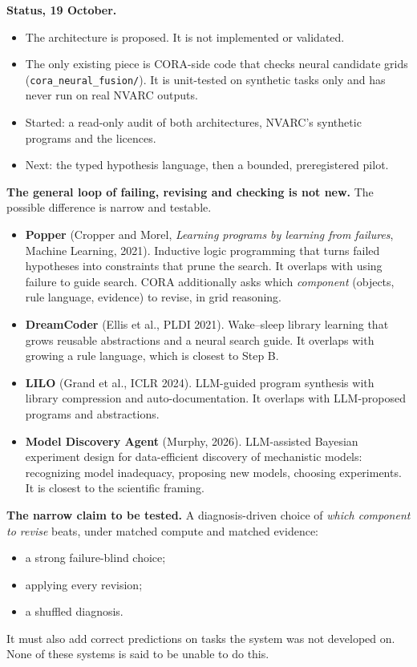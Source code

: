 \documentclass[11pt]{article}
\newcommand{\page}[1]{\clearpage{\Large\bfseries #1}\par\vspace{0.2em}}
\begin{document}
\textbf{Status, 19 October.}
\begin{itemize}
  \item The architecture is proposed. It is not implemented or validated.
  \item The only existing piece is CORA-side code that checks neural candidate grids (\texttt{cora\_neural\_fusion/}).
        It is unit-tested on synthetic tasks only and has never run on real NVARC outputs.
  \item Started: a read-only audit of both architectures, NVARC's synthetic programs and the licences.
  \item Next: the typed hypothesis language, then a bounded, preregistered pilot.
\end{itemize}

\page{9. Where this sits in prior work}
\textbf{The general loop of failing, revising and checking is not new.} The possible difference is narrow and testable.
\begin{itemize}
  \item \textbf{Popper} (Cropper and Morel, \emph{Learning programs by learning from failures}, Machine Learning,
        2021). Inductive logic programming that turns failed hypotheses into constraints that prune the search. It
        overlaps with using failure to guide search. CORA additionally asks which \emph{component} (objects, rule
        language, evidence) to revise, in grid reasoning.
  \item \textbf{DreamCoder} (Ellis et al., PLDI 2021). Wake--sleep library learning that grows reusable abstractions
        and a neural search guide. It overlaps with growing a rule language, which is closest to Step B.
  \item \textbf{LILO} (Grand et al., ICLR 2024). LLM-guided program synthesis with library compression and
        auto-documentation. It overlaps with LLM-proposed programs and abstractions.
  \item \textbf{Model Discovery Agent} (Murphy, 2026). LLM-assisted Bayesian experiment design for data-efficient
        discovery of mechanistic models: recognizing model inadequacy, proposing new models, choosing experiments. It
        is closest to the scientific framing.
\end{itemize}
\textbf{The narrow claim to be tested.} A diagnosis-driven choice of \emph{which component to revise} beats, under
matched compute and matched evidence:
\begin{itemize}
  \item a strong failure-blind choice;
  \item applying every revision;
  \item a shuffled diagnosis.
\end{itemize}
It must also add correct predictions on tasks the system was not developed on. None of these systems is said to be
unable to do this.
\end{document}
